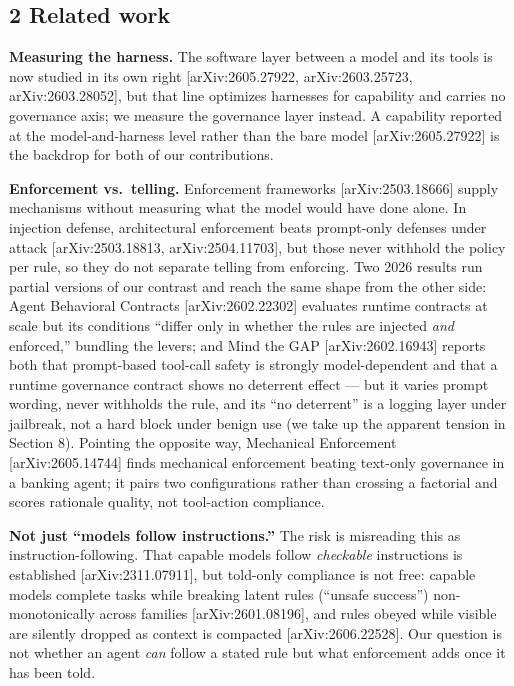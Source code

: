 \documentclass[
]{article}
\begin{document}
\subsection{2 Related work}\label{related-work}

\textbf{Measuring the harness.} The software layer between a model and
its tools is now studied in its own right {[}arXiv:2605.27922,
arXiv:2603.25723, arXiv:2603.28052{]}, but that line optimizes harnesses
for capability and carries no governance axis; we measure the governance
layer instead. A capability reported at the model-and-harness level
rather than the bare model {[}arXiv:2605.27922{]} is the backdrop for
both of our contributions.

\textbf{Enforcement vs.~telling.} Enforcement frameworks
{[}arXiv:2503.18666{]} supply mechanisms without measuring what the
model would have done alone. In injection defense, architectural
enforcement beats prompt-only defenses under attack {[}arXiv:2503.18813,
arXiv:2504.11703{]}, but those never withhold the policy per rule, so
they do not separate telling from enforcing. Two 2026 results run
partial versions of our contrast and reach the same shape from the other
side: Agent Behavioral Contracts {[}arXiv:2602.22302{]} evaluates
runtime contracts at scale but its conditions ``differ only in whether
the rules are injected \emph{and} enforced,'' bundling the levers; and
Mind the GAP {[}arXiv:2602.16943{]} reports both that prompt-based
tool-call safety is strongly model-dependent and that a runtime
governance contract shows no deterrent effect --- but it varies prompt
wording, never withholds the rule, and its ``no deterrent'' is a logging
layer under jailbreak, not a hard block under benign use (we take up the
apparent tension in Section 8). Pointing the opposite way, Mechanical
Enforcement {[}arXiv:2605.14744{]} finds mechanical enforcement beating
text-only governance in a banking agent; it pairs two configurations
rather than crossing a factorial and scores rationale quality, not
tool-action compliance.

\textbf{Not just ``models follow instructions.''} The risk is misreading
this as instruction-following. That capable models follow
\emph{checkable} instructions is established {[}arXiv:2311.07911{]}, but
told-only compliance is not free: capable models complete tasks while
breaking latent rules (``unsafe success'') non-monotonically across
families {[}arXiv:2601.08196{]}, and rules obeyed while visible are
silently dropped as context is compacted {[}arXiv:2606.22528{]}. Our
question is not whether an agent \emph{can} follow a stated rule but
what enforcement adds once it has been told.
\end{document}
